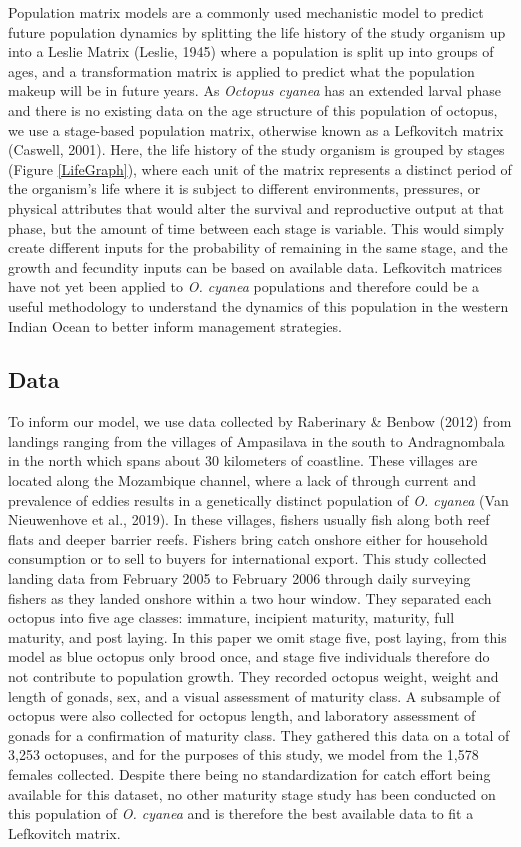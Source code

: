 \documentclass[
]{article}
\begin{document}
Population matrix models are a commonly used mechanistic model to predict future population dynamics by splitting the life history of the study organism up into a Leslie Matrix (Leslie, 1945) where a population is split up into groups of ages, and a transformation matrix is applied to predict what the population makeup will be in future years. As \emph{Octopus cyanea} has an extended larval phase and there is no existing data on the age structure of this population of octopus, we use a stage-based population matrix, otherwise known as a Lefkovitch matrix (Caswell, 2001). Here, the life history of the study organism is grouped by stages (Figure \ref{LifeGraph}), where each unit of the matrix represents a distinct period of the organism's life where it is subject to different environments, pressures, or physical attributes that would alter the survival and reproductive output at that phase, but the amount of time between each stage is variable. This would simply create different inputs for the probability of remaining in the same stage, and the growth and fecundity inputs can be based on available data. Lefkovitch matrices have not yet been applied to \emph{O. cyanea} populations and therefore could be a useful methodology to understand the dynamics of this population in the western Indian Ocean to better inform management strategies.

\hypertarget{data}{%
\subsection{Data}\label{data}}

To inform our model, we use data collected by Raberinary \& Benbow (2012) from landings ranging from the villages of Ampasilava in the south to Andragnombala in the north which spans about 30 kilometers of coastline. These villages are located along the Mozambique channel, where a lack of through current and prevalence of eddies results in a genetically distinct population of \emph{O. cyanea} (Van Nieuwenhove et al., 2019). In these villages, fishers usually fish along both reef flats and deeper barrier reefs. Fishers bring catch onshore either for household consumption or to sell to buyers for international export. This study collected landing data from February 2005 to February 2006 through daily surveying fishers as they landed onshore within a two hour window. They separated each octopus into five age classes: immature, incipient maturity, maturity, full maturity, and post laying. In this paper we omit stage five, post laying, from this model as blue octopus only brood once, and stage five individuals therefore do not contribute to population growth. They recorded octopus weight, weight and length of gonads, sex, and a visual assessment of maturity class. A subsample of octopus were also collected for octopus length, and laboratory assessment of gonads for a confirmation of maturity class. They gathered this data on a total of 3,253 octopuses, and for the purposes of this study, we model from the 1,578 females collected. Despite there being no standardization for catch effort being available for this dataset, no other maturity stage study has been conducted on this population of \emph{O. cyanea} and is therefore the best available data to fit a Lefkovitch matrix.
\end{document}

